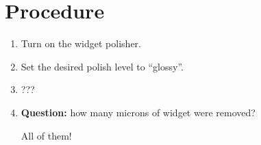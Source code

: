 \documentclass[answerkey,engineering,twoside]{mun-lab}
\begin{document}
\maketitle



\section{Procedure}

\begin{enumerate}

\item Turn on the widget polisher.
\item Set the desired polish level to ``glossy''.
\item ???
\item \textbf{Question:} how many microns of widget were removed?
    \begin{answer}
    All of them!
    \end{answer}

\end{enumerate}
\end{document}
